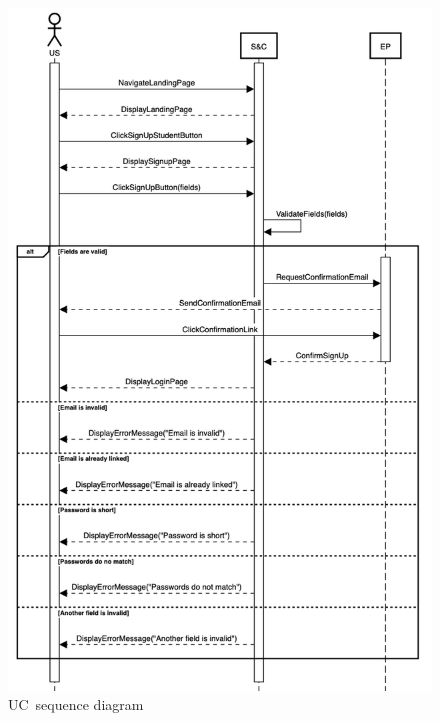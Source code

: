 \begin{figure}
    \centering
    \includegraphics[width=13cm]{images/sequence-diagrams/student-signs-up.png}
    \caption{UC\theuc\ sequence diagram}
\end{figure}


